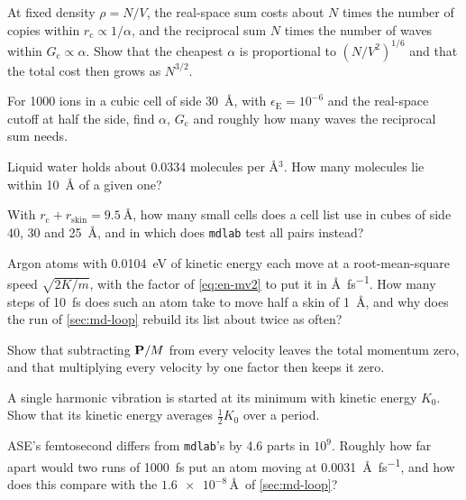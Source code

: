 \begin{exercise}
\label{ex:md-cost}
At fixed density $\rho = N/V$, the real-space sum costs about $N$ times
the number of copies within $r_{\mathrm c} \propto 1/\alpha$, and the
reciprocal sum $N$ times the number of waves within $G_{\mathrm c}
\propto \alpha$. Show that the cheapest $\alpha$ is proportional to
$(N/V^2)^{1/6}$ and that the total cost then grows as $N^{3/2}$.
\end{exercise}

\begin{exercise}
\label{ex:md-parameters}
For 1000 ions in a cubic cell of side \SI{30}{\angstrom}, with
$\epsilon_{\mathrm E} = 10^{-6}$ and the real-space cutoff at half the
side, find $\alpha$, $G_{\mathrm c}$ and roughly how many waves the
reciprocal sum needs.
\end{exercise}

\begin{exercise}
\label{ex:md-water}
Liquid water holds about 0.0334 molecules per \AA$^3$. How many molecules
lie within \SI{10}{\angstrom} of a given one?
\end{exercise}

\begin{exercise}
\label{ex:md-cells}
With $r_{\mathrm c} + r_{\mathrm{skin}} = \SI{9.5}{\angstrom}$, how many small
cells does a cell list use in cubes of side 40, 30 and
\SI{25}{\angstrom}, and in which does \texttt{mdlab} test all pairs
instead?
\end{exercise}

\begin{exercise}
\label{ex:md-rebuild}
Argon atoms with \SI{0.0104}{\electronvolt} of kinetic energy each move
at a root-mean-square speed $\sqrt{2K/m}$, with the factor of
\cref{eq:en-mv2} to put it in \si{\angstrom\per\femto\second}. How many
steps of
\SI{10}{\femto\second} does such an atom take to move half a skin of
\SI{1}{\angstrom}, and why does the run of \cref{sec:md-loop} rebuild its
list about twice as often?
\end{exercise}

\begin{exercise}[no drift]
\label{ex:md-drift}
Show that subtracting $\bm{\mathrm{P}}/M$ from every velocity leaves the total
momentum zero, and that multiplying every velocity by one factor then
keeps it zero.
\end{exercise}

\begin{exercise}
\label{ex:md-half}
A single harmonic vibration is started at its minimum with kinetic energy
$K_0$. Show that its kinetic energy averages $\frac12K_0$ over a period.
\end{exercise}

\begin{exercise}
\label{ex:md-femtosecond}
ASE's femtosecond differs from \texttt{mdlab}'s by 4.6 parts in $10^9$.
Roughly how far apart would two runs of \SI{1000}{\femto\second} put an
atom moving at \SI{0.0031}{\angstrom\per\femto\second}, and how does this
compare with the $\num{1.6e-8}$\,\AA\ of \cref{sec:md-loop}?
\end{exercise}
